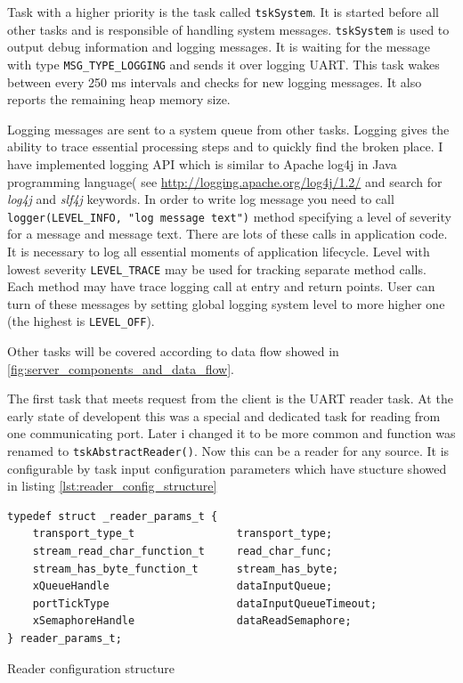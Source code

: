 Task with a higher priority is the task called  \texttt{tskSystem}.
It is started before all other tasks and is responsible of handling system
messages. 
\texttt{tskSystem} is used to output debug information and logging messages.
It is waiting for the message with type \texttt{MSG\_TYPE\_LOGGING} and sends it
over logging UART.
This task wakes between every 250 ms intervals and checks for new logging
messages. It also reports the remaining heap memory size.

Logging messages are sent to a system queue from other tasks.
Logging gives the ability to trace essential processing steps and to quickly
find the broken place.
I have implemented logging API which is similar to Apache log4j in Java
programming language( see \url{http://logging.apache.org/log4j/1.2/} and search
for \textit{log4j} and \textit{slf4j} keywords.
In order to write log message you need to call \texttt{logger(LEVEL\_INFO,
"log message text")} method specifying a level of severity for a message and
message text. There are  lots of these calls in application code. It is
necessary to log all essential moments of application lifecycle. Level with
lowest severity \texttt{LEVEL\_TRACE} may be used for tracking separate method
calls. Each method may have trace logging call at entry and return points.
User can turn of these messages by setting global logging system level to more
higher one (the highest is \texttt{LEVEL\_OFF}).

Other tasks will be covered according to data flow showed in
\autoref{fig:server_components_and_data_flow}.

The first task that meets request from the client is the UART reader task.
At the early state of developent this was a special and dedicated task for
reading from one communicating port. Later i changed it to be more common and
function was renamed to \texttt{tskAbstractReader()}. Now this can be a
reader for any source. It is configurable by task input configuration parameters
which have stucture showed in listing \ref{lst:reader_config_structure}

\begin{listing}[H]
\begin{verbatim}
typedef struct _reader_params_t {
	transport_type_t				transport_type;
	stream_read_char_function_t		read_char_func;
	stream_has_byte_function_t		stream_has_byte;
	xQueueHandle					dataInputQueue;
	portTickType					dataInputQueueTimeout;
	xSemaphoreHandle				dataReadSemaphore;
} reader_params_t;
\end{verbatim}
\caption{Reader configuration structure}
\label{lst:reader_config_structure}
\end{listing}

